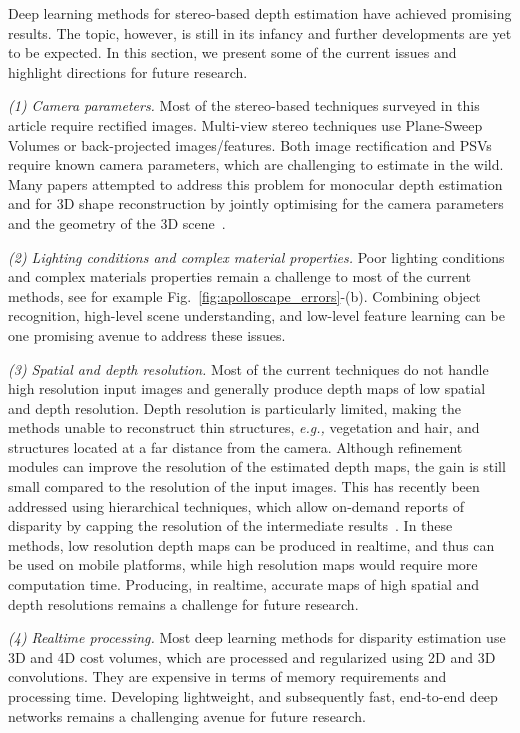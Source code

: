 \documentclass[10pt,journal,compsoc]{IEEEtran}
\newcommand{\eg}{\emph{e.g., }}
\newcommand{\noi}{\noindent}
\begin{document}
Deep learning methods for stereo-based depth estimation  have achieved promising results. The topic, however, is still in its infancy and further developments are yet to be expected. In this section, we present some of the current issues and highlight  directions for future research.    

\vspace{6pt}
\noi\textit{(1) Camera parameters. } Most of the stereo-based  techniques surveyed in this article require rectified images.  Multi-view stereo techniques use  Plane-Sweep Volumes or back-projected  images/features. Both  image rectification and PSVs  require known camera parameters, which are challenging to estimate in the wild.   Many  papers attempted to address this problem  for monocular depth estimation and for 3D shape reconstruction by jointly optimising for the camera parameters and the geometry of the 3D scene~\cite{han2020image}.

\vspace{6pt}
\noi\textit{(2) Lighting conditions and complex material properties.  }  Poor lighting conditions and complex materials properties  remain a challenge to most of the current methods, see for example Fig.~\ref{fig:apolloscape_errors}-(b). Combining object recognition,  high-level  scene understanding, and  low-level feature learning can be one promising avenue to address these issues.

\vspace{6pt}
\noi\textit{(3) Spatial and depth resolution. } Most of the current techniques do not handle high resolution input images and generally produce depth maps of low  spatial and depth resolution. Depth resolution is particularly limited, making the methods unable to reconstruct thin structures,  \eg vegetation and hair,  and structures located at a far distance from the camera.  Although refinement modules can improve the resolution of the estimated depth maps, the gain  is still small compared to the resolution of the input images.   This has recently been addressed using hierarchical techniques, which allow on-demand reports of disparity by capping the resolution of the intermediate results~\cite{Yang_2019_CVPR}. In these methods, low resolution depth maps can be produced in realtime, and thus can be used on mobile platforms, while high resolution  maps would require more computation time.  Producing, in realtime,  accurate maps of high spatial and depth resolutions remains a challenge  for future research.  

\vspace{6pt}
\noi\textit{(4) Realtime processing. } Most deep learning methods for disparity estimation use 3D and 4D cost volumes, which are processed and regularized using 2D and 3D convolutions. They are expensive in terms of memory requirements and processing time. Developing lightweight, and subsequently fast, end-to-end deep networks remains a challenging avenue for future research.
\end{document}
